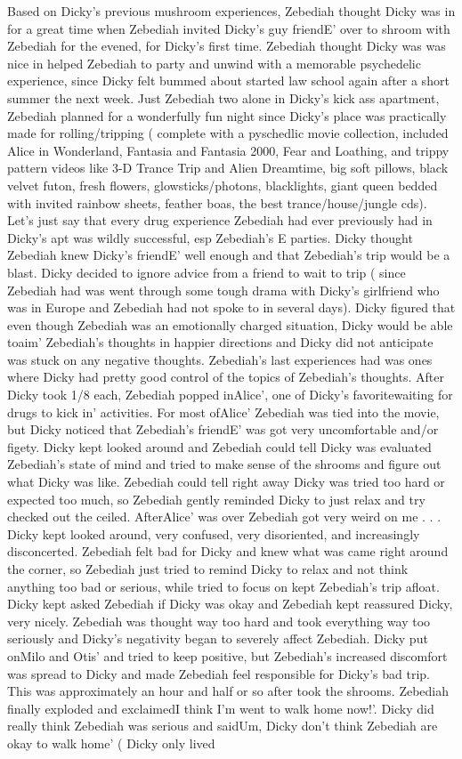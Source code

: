 \documentclass[12pt]{book}
\begin{document}
Based on Dicky's previous mushroom experiences, Zebediah thought Dicky was in for a great time when Zebediah invited Dicky's guy friendE' over to shroom with Zebediah for the evened, for Dicky's first time. Zebediah thought Dicky was was nice in helped Zebediah to party and unwind with a memorable psychedelic experience, since Dicky felt bummed about started law school again after a short summer the next week. Just Zebediah two alone in Dicky's kick ass apartment, Zebediah planned for a wonderfully fun night since Dicky's place was practically made for rolling/tripping ( complete with a pyschedlic movie collection, included Alice in Wonderland, Fantasia and Fantasia 2000, Fear and Loathing, and trippy pattern videos like 3-D Trance Trip and Alien Dreamtime, big soft pillows, black velvet futon, fresh flowers, glowsticks/photons, blacklights, giant queen bedded with invited rainbow sheets, feather boas, the best trance/house/jungle cds). Let's just say that every drug experience Zebediah had ever previously had in Dicky's apt was wildly successful, esp Zebediah's E parties. Dicky thought Zebediah knew Dicky's friendE' well enough and that Zebediah's trip would be a blast. Dicky decided to ignore advice from a friend to wait to trip ( since Zebediah had was went through some tough drama with Dicky's girlfriend who was in Europe and Zebediah had not spoke to in several days). Dicky figured that even though Zebediah was an emotionally charged situation, Dicky would be able toaim' Zebediah's thoughts in happier directions and Dicky did not anticipate was stuck on any negative thoughts. Zebediah's last experiences had was ones where Dicky had pretty good control of the topics of Zebediah's thoughts. After Dicky took 1/8 each, Zebediah popped inAlice', one of Dicky's favoritewaiting for drugs to kick in' activities. For most ofAlice' Zebediah was tied into the movie, but Dicky noticed that Zebediah's friendE' was got very uncomfortable and/or figety. Dicky kept looked around and Zebediah could tell Dicky was evaluated Zebediah's state of mind and tried to make sense of the shrooms and figure out what Dicky was like. Zebediah could tell right away Dicky was tried too hard or expected too much, so Zebediah gently reminded Dicky to just relax and try checked out the ceiled. AfterAlice' was over Zebediah got very weird on me . . .  Dicky kept looked around, very confused, very disoriented, and increasingly disconcerted. Zebediah felt bad for Dicky and knew what was came right around the corner, so Zebediah just tried to remind Dicky to relax and not think anything too bad or serious, while tried to focus on kept Zebediah's trip afloat. Dicky kept asked Zebediah if Dicky was okay and Zebediah kept reassured Dicky, very nicely. Zebediah was thought way too hard and took everything way too seriously and Dicky's negativity began to severely affect Zebediah. Dicky put onMilo and Otis' and tried to keep positive, but Zebediah's increased discomfort was spread to Dicky and made Zebediah feel responsible for Dicky's bad trip. This was approximately an hour and half or so after took the shrooms. Zebediah finally exploded and exclaimedI think I'm went to walk home now!'. Dicky did really think Zebediah was serious and saidUm, Dicky don't think Zebediah are okay to walk home' ( Dicky only lived 
\end{document}
